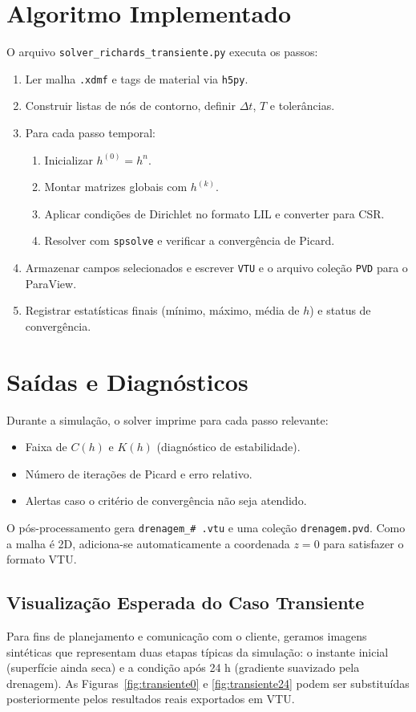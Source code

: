 \documentclass[a4paper,12pt]{article}
\begin{document}
\section{Algoritmo Implementado}
O arquivo \texttt{solver\_richards\_transiente.py} executa os passos:
\begin{enumerate}
    \item Ler malha \texttt{.xdmf} e tags de material via \texttt{h5py}.
    \item Construir listas de nós de contorno, definir $\Delta t$, $T$ e tolerâncias.
    \item Para cada passo temporal:
    \begin{enumerate}
        \item Inicializar $h^{(0)} = h^n$.
        \item Montar matrizes globais com $h^{(k)}$.
        \item Aplicar condições de Dirichlet no formato LIL e converter para CSR.
        \item Resolver com \texttt{spsolve} e verificar a convergência de Picard.
    \end{enumerate}
    \item Armazenar campos selecionados e escrever \texttt{VTU} e o arquivo coleção \texttt{PVD} para o ParaView.
    \item Registrar estatísticas finais (mínimo, máximo, média de $h$) e status de convergência.
\end{enumerate}

\section{Saídas e Diagnósticos}
Durante a simulação, o solver imprime para cada passo relevante:
\begin{itemize}
    \item Faixa de $C(h)$ e $K(h)$ (diagnóstico de estabilidade).
    \item Número de iterações de Picard e erro relativo.
    \item Alertas caso o critério de convergência não seja atendido.
\end{itemize}
O pós-processamento gera \texttt{drenagem\_\# .vtu} e uma coleção \texttt{drenagem.pvd}. Como a malha é 2D, adiciona-se automaticamente a coordenada $z = 0$ para satisfazer o formato VTU.

\subsection{Visualização Esperada do Caso Transiente}
Para fins de planejamento e comunicação com o cliente, geramos imagens sintéticas que representam duas etapas típicas da simulação: o instante inicial (superfície ainda seca) e a condição após 24 h (gradiente suavizado pela drenagem). As Figuras~\ref{fig:transiente0} e \ref{fig:transiente24} podem ser substituídas posteriormente pelos resultados reais exportados em VTU.
\end{document}
